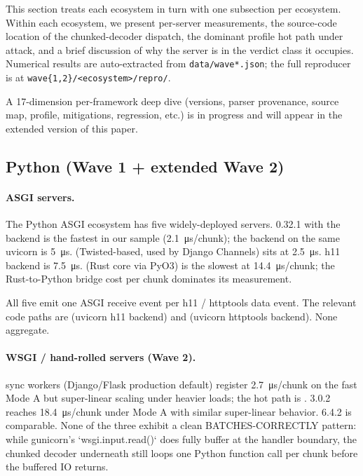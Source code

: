 This section treats each ecosystem in turn with one subsection per
ecosystem. Within each ecosystem, we present per-server
measurements, the source-code location of the chunked-decoder
dispatch, the dominant profile hot path under attack, and a brief
discussion of why the server is in the verdict class it occupies.
Numerical results are auto-extracted from \texttt{data/wave*.json};
the full reproducer is at \texttt{wave\{1,2\}/<ecosystem>/repro/}.

A 17-dimension per-framework deep dive (versions, parser
provenance, source map, profile, mitigations, regression, etc.)
is in progress and will appear in the extended version of this
paper.

\subsection{Python (Wave 1 + extended Wave 2)}
\label{sec:pf-python}

\paragraph{ASGI servers.}
The Python ASGI ecosystem has five widely-deployed servers.
 0.32.1 with the  backend is the
fastest in our sample (\SI{2.1}{\micro\second}/chunk); the
 backend on the same uvicorn is \SI{5}{\micro\second}.
 (Twisted-based, used by Django Channels) sits at
\SI{2.5}{\micro\second}.  h11 backend is
\SI{7.5}{\micro\second}.  (Rust core via PyO3) is
the slowest at \SI{14.4}{\micro\second}/chunk; the Rust-to-Python
bridge cost per chunk dominates its measurement.

All five emit one ASGI  receive
event per h11 / httptools data event. The relevant code paths are
 (uvicorn h11
backend) and 
(uvicorn httptools backend). None aggregate.

\paragraph{WSGI / hand-rolled servers (Wave 2).}
 sync workers (Django/Flask production default)
register \SI{2.7}{\micro\second}/chunk on the fast Mode A but
super-linear scaling under heavier loads; the hot path is
. 
3.0.2 reaches \SI{18.4}{\micro\second}/chunk under Mode A with
similar super-linear behavior.  6.4.2 is comparable.
None of the three exhibit a clean BATCHES-CORRECTLY pattern: while
gunicorn's `wsgi.input.read()` does fully buffer at the handler
boundary, the chunked decoder underneath still loops one Python
function call per chunk before the buffered IO returns.

